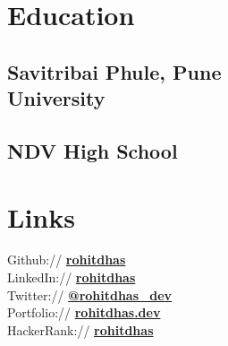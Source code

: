\documentclass[]{deedy-resume-openfont}
\begin{document}
%
%

%
%

%
%

\begin{minipage}[t]{0.31\textwidth} 




\section{Education} 

\subsection{Savitribai Phule, Pune \\ University}
\sectionsep

\subsection{NDV High School}
\sectionsep


\section{Links}
Github:// \href{https://github.com/rohitdhas}{\bf rohitdhas} \\
LinkedIn://  \href{https://www.linkedin.com/in/rohitdhas}{\bf rohitdhas} \\
Twitter://  \href{https://twitter.com/rohitdhas_dev}{\bf @rohitdhas\_dev} \\
Portfolio://  \href{https://rohitdhas.dev}{\bf rohitdhas.dev} \\
HackerRank:// \href{https://www.hackerrank.com/rohitdhas?hr_r=1}{\bf rohitdhas} \\
\sectionsep


\end{minipage}
\end{document}
